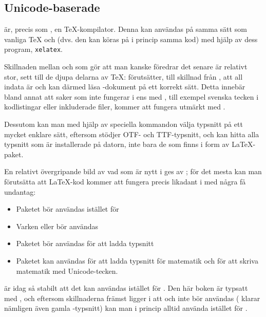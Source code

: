 \documentclass[10pt,../../a4.tex]{subfiles}
\begin{document}
\subsection{Unicode-baserade \XeTeX}
\XeTeX{} är, precis som \pdfLaTeX, en \TeX-kompilator. Denna kan användas
på samma sätt som vanliga \TeX{} och \pdfLaTeX{} (dvs. den kan köras på i
princip samma kod) med hjälp av dess program, \texttt{xelatex}.

Skillnaden mellan \pdfLaTeX{} och \XeTeX{} som gör att man kanske föredrar
det senare är relativt stor, sett till de djupa delarna av \TeX: \XeTeX{} 
förutsätter, till skillnad från \pdfLaTeX, att all indata är \UTF och kan
därmed läsa \UTF-dokument på ett korrekt sätt. Detta innebär bland annat
att saker som inte fungerar i \pdfLaTeX{} ens med , till
exempel svenska tecken i kodlistingar eller inkluderade filer, kommer att
fungera utmärkt med \XeTeX.

Dessutom kan man med hjälp av speciella kommandon välja typsnitt på ett
mycket enklare sätt, eftersom \XeTeX{} stödjer \textsc{OTF}- och
\textsc{TTF}-typsnitt, och kan hitta alla typsnitt som är installerade
på datorn, inte bara de som finns i form av \LaTeX-paket.

En relativt övergripande bild av vad som är nytt i \XeTeX{} ges av
\textcite{Robertson11}; för det mesta kan man förutsätta att \LaTeX-kod
kommer att fungera precis likadant i \XeTeX{} med några få undantag:
\begin{itemize}
	\item Paketet  bör användas istället för 
	\item Varken  eller  bör användas
	\item Paketet  bör användas för att ladda typsnitt
	\item Paketet  kan användas för att ladda typsnitt
		  för matematik och för att skriva matematik med Unicode-tecken.
\end{itemize}

\XeTeX{} är idag så stabilt att det kan användas istället för \pdfLaTeX.
Den här boken är typsatt med \XeTeX, och eftersom skillnaderna främst
ligger i att  och  inte bör användas (\XeTeX
klarar nämligen även gamla \pdfLaTeX-typsnitt) kan man i princip alltid
använda \XeTeX{} istället för \pdfLaTeX.
\end{document}
